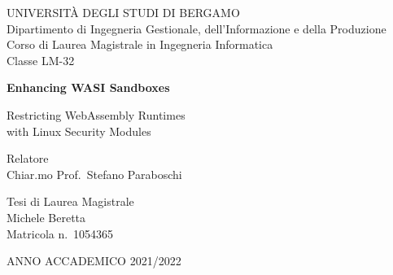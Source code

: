 \begin{titlepage}
  \begin{center}
    \large
    UNIVERSITÀ DEGLI STUDI DI BERGAMO \\
    \vspace{0.5cm}
    \normalsize
    Dipartimento di Ingegneria Gestionale, dell'Informazione e della Produzione \\
    Corso di Laurea Magistrale in Ingegneria Informatica \\
    Classe LM-32

    \vspace*{3cm}

    \Huge
    \textbf{Enhancing WASI Sandboxes}

    \vspace{0.5cm}
    \LARGE
    Restricting WebAssembly Runtimes \\ with Linux Security Modules
  \end{center}

  \vfill

  \begin{flushleft}
    Relatore \\
    Chiar.mo Prof.\ Stefano Paraboschi
  \end{flushleft}

  \vspace{1cm}

  \begin{flushright}
    Tesi di Laurea Magistrale \\
    Michele Beretta \\
    Matricola n.\ 1054365
  \end{flushright}

  \vfill

  \begin{center}
    ANNO ACCADEMICO 2021/2022
  \end{center}
\end{titlepage}